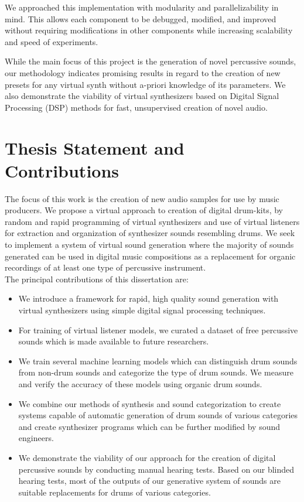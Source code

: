 \documentclass[\main/thesis.tex]{subfiles}
\begin{document}
We approached this implementation with modularity and parallelizability in mind. This allows each component to be debugged, modified, and improved without requiring modifications in other components while increasing scalability and speed of experiments. 


While the main focus of this project is the generation of novel percussive sounds, our methodology indicates promising results in regard to the creation of new presets for any virtual synth without a-priori knowledge of its parameters. We also demonstrate the viability of virtual synthesizers based on Digital Signal Processing (DSP) methods for fast, unsupervised creation of novel audio. 




\section{Thesis Statement and Contributions}
\label{sec:thesis_statement}
 The focus of this work is the creation of new audio samples for use by music producers. We propose a virtual approach to creation of digital drum-kits, by random and rapid programming of virtual synthesizers and use of virtual listeners for extraction and organization of synthesizer sounds resembling drums. We seek to implement a system of virtual sound generation where the majority of sounds generated can be used in digital music compositions as a replacement for organic recordings of at least one type of percussive instrument.\\
  
  The principal contributions of this dissertation are:
\begin{itemize}
  \item We introduce a framework for rapid, high quality sound generation with virtual synthesizers using simple digital signal processing techniques. 
  \item For training of virtual listener models, we curated a dataset of free percussive sounds which is made available to future researchers. 
  \item We train several machine learning models which can distinguish drum sounds from non-drum sounds and categorize the type of drum sounds. We measure and verify the accuracy of these models using organic drum sounds. 
  \item We combine our methods of synthesis and sound categorization to create systems capable of automatic generation of drum sounds of various categories and create synthesizer programs which can be further modified by sound engineers.
  \item We demonstrate the viability of our approach for the creation of digital percussive sounds by conducting manual hearing tests. Based on our blinded hearing tests, most of the outputs of our generative system of sounds are suitable replacements for drums of various categories. 
\end{itemize}
\end{document}
